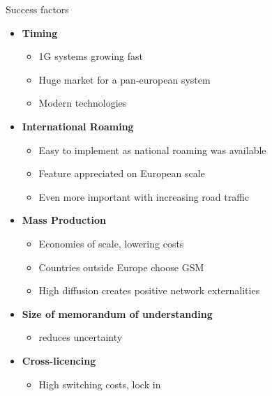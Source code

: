 \begin{frame}{Success factors}
  \begin{itemize}
    \item \textbf{Timing}
    \begin{itemize}
      \item 1G systems growing fast
      \item Huge market for a pan-european system
      \item Modern technologies 
    \end{itemize}
    \item \textbf{International Roaming}
    \begin{itemize}
      \item Easy to implement as national roaming was available
      \item Feature appreciated on European scale
      \item Even more important with increasing road traffic 
    \end{itemize}
    \item \textbf{Mass Production}
    \begin{itemize}
      \item Economies of scale, lowering costs
      \item Countries outside Europe choose GSM
      \item High diffusion creates positive network externalities
    \end{itemize}
    \item \textbf{Size of memorandum of understanding}
    \begin{itemize}
      \item reduces uncertainty
    \end{itemize}
    \item \textbf{Cross-licencing}
    \begin{itemize}
      \item High switching costs, lock in
    \end{itemize} 
  \end{itemize}
\end{frame}

